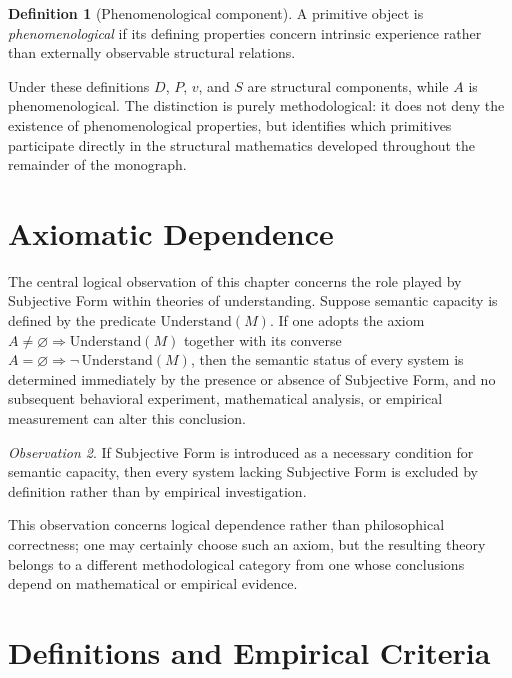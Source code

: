 \documentclass[11pt,twoside,openright]{book}
\numberwithin{equation}{chapter}
\theoremstyle{definition}
\newtheorem{definition}{Definition}[chapter]
\theoremstyle{plain}
\theoremstyle{remark}
\newtheorem{observation}[definition]{Observation}
\theoremstyle{definition}
\newcommand{\WData}{D}
\newcommand{\WPrehensions}{P}
\newcommand{\WValuation}{v}
\newcommand{\WSatisfaction}{S}
\newcommand{\WSubjForm}{A}
\begin{document}
\begin{definition}[Phenomenological component]
A primitive object is \emph{phenomenological} if its defining properties
concern intrinsic experience rather than externally observable structural
relations.
\end{definition}

Under these definitions $\WData$, $\WPrehensions$, $\WValuation$, and
$\WSatisfaction$ are structural components, while $\WSubjForm$ is
phenomenological. The distinction is purely methodological: it does not
deny the existence of phenomenological properties, but identifies which
primitives participate directly in the structural mathematics developed
throughout the remainder of the monograph.

\section{Axiomatic Dependence}

The central logical observation of this chapter concerns the role played
by Subjective Form within theories of understanding. Suppose semantic
capacity is defined by the predicate $\mathrm{Understand}(M)$. If one
adopts the axiom $\WSubjForm\neq\varnothing\Rightarrow\mathrm{Understand}(M)$
together with its converse
$\WSubjForm=\varnothing\Rightarrow\neg\,\mathrm{Understand}(M)$, then the
semantic status of every system is determined immediately by the presence
or absence of Subjective Form, and no subsequent behavioral experiment,
mathematical analysis, or empirical measurement can alter this
conclusion.

\begin{observation}
If Subjective Form is introduced as a necessary condition for semantic
capacity, then every system lacking Subjective Form is excluded by
definition rather than by empirical investigation.
\end{observation}

This observation concerns logical dependence rather than philosophical
correctness; one may certainly choose such an axiom, but the resulting
theory belongs to a different methodological category from one whose
conclusions depend on mathematical or empirical evidence.

\section{Definitions and Empirical Criteria}
\end{document}
